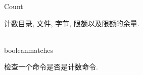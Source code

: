\begin{XeClass}{Count}
   
 计数目录, 文件, 字节, 限额以及限额的余量.

  \begin{XeMethod}{\XePublic\\ }{boolean}{matches}
       
 检查一个命令是否是计数命令.

  \end{XeMethod}

\end{XeClass}
